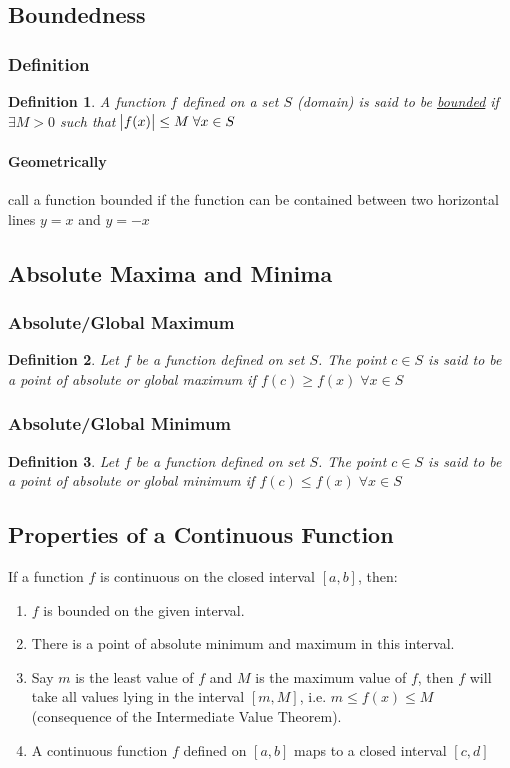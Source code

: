 \documentclass[14]{article}
\newtheorem{define}{Definition}
\theoremstyle{definition}
\begin{document}
\subsection{Boundedness}
\subsubsection{Definition}
\begin{define}
A function $f$ defined on a set $S$ (domain) is said to be \underline{bounded} if $\exists M > 0$ such that $\abs{f(x)} \leq M \; \forall x \in S$
\end{define}
\paragraph{Geometrically} call a function bounded if the function can be contained between two horizontal lines $y = x$ and $y = -x$
\pagebreak
\subsection{Absolute Maxima and Minima}
\subsubsection{Absolute/Global Maximum}
\begin{define}
Let $f$ be a function defined on set $S$. The point $c \in S$ is said to be a point of absolute or global maximum if $f(c) \geq f(x) \; \forall x \in S$
\end{define}
\subsubsection{Absolute/Global Minimum}
\begin{define}
Let $f$ be a function defined on set $S$. The point $c \in S$ is said to be a point of absolute or global minimum if $f(c) \leq f(x) \; \forall x \in S$
\end{define}
\subsection{Properties of a Continuous Function}
If a function $f$ is continuous on the closed interval $[a, b]$, then:
\begin{enumerate}
\item $f$ is bounded on the given interval.
\item There is a point of absolute minimum and maximum in this interval.
\item Say $m$ is the least value of $f$ and $M$ is the maximum value of $f$, then $f$ will take all values lying in the interval $[m, M]$, i.e. $m \leq f(x) \leq M$ (consequence of the Intermediate Value Theorem).
\item A continuous function $f$ defined on $[a, b]$ maps to a closed interval $[c, d]$
\end{enumerate}
\end{document}
